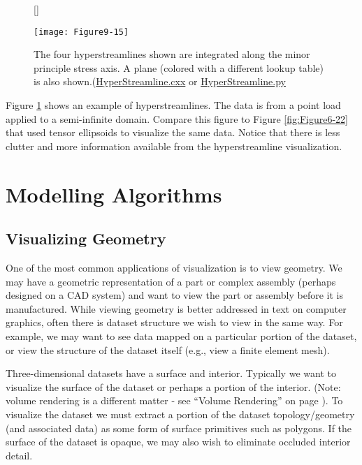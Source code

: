 \begin{figure}[!htb]
	[\FBwidth]
	{\caption{The four hyperstreamlines shown are integrated along the minor principle stress axis. A plane (colored with a different lookup table) is also shown.(\href{https://lorensen.github.io/VTKExamples/site/Cxx/VisualizationAlgorithms/HyperStreamline/}{HyperStreamline.cxx} or \href{https://lorensen.github.io/VTKExamples/site/Python/VisualizationAlgorithms/HyperStreamline/}{HyperStreamline.py}}\label{fig:Figure9-15}}
	{\texttt{[image: Figure9-15]}}
\end{figure}


Figure \ref{fig:Figure9-15} shows an example of hyperstreamlines. The data is from a point load applied to a semi-infinite domain. Compare this figure to Figure \ref{fig:Figure6-22} that used tensor ellipsoids to visualize the same data. Notice that there is less clutter and more information available from the hyperstreamline visualization.



\section{Modelling Algorithms}

\subsection{Visualizing Geometry}

One of the most common applications of visualization is to view geometry. We may have a geometric representation of a part or complex assembly (perhaps designed on a CAD system) and want to view the part or assembly before it is manufactured. While viewing geometry is better addressed in text on computer graphics, often there is dataset structure we wish to view in the same way. For example, we may want to see data mapped on a particular portion of the dataset, or view the structure of the dataset itself (e.g., view a finite element mesh).

Three-dimensional datasets have a surface and interior. Typically we want to visualize the surface of the dataset or perhaps a portion of the interior. (Note: volume rendering is a different matter - see ``Volume Rendering'' on page \pageref{sec:volume_rendering}). To visualize the dataset we must extract a portion of the dataset topology/geometry (and associated data) as some form of surface primitives such as polygons. If the surface of the dataset is opaque, we may also wish to eliminate occluded interior detail.


